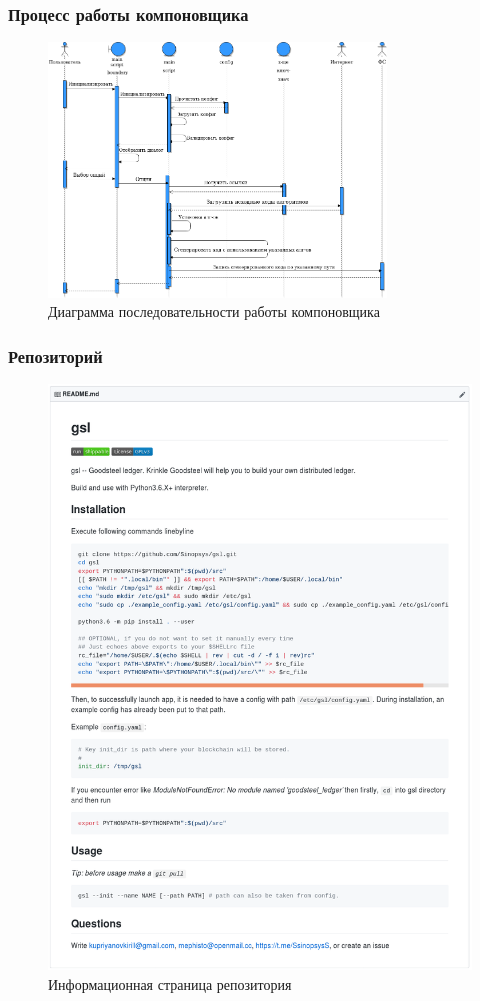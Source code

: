 \documentclass{beamer}
\begin{document}
\begin{frame}
    \frametitle{Процесс работы компоновщика}
    \begin{figure}
        \centering
        \includegraphics[width=0.8\textwidth]{sequence}
        \caption{\small Диаграмма последовательности работы компоновщика}
    \end{figure}
\end{frame}

\begin{frame}
    \frametitle{Репозиторий}
    \begin{figure}
        \centering
        \includegraphics[height=0.7\textheight]{repo}
        \caption{\small Информационная страница репозитория}
    \end{figure}
\end{frame}
\end{document}
